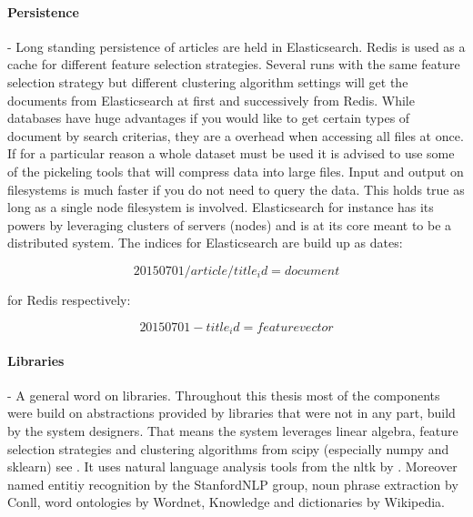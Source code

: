   \paragraph{Persistence} - Long standing persistence of articles are held in Elasticsearch. Redis is used as a cache for different feature selection strategies. Several runs with the same feature selection strategy but different clustering algorithm settings will get the documents from Elasticsearch at first and successively from Redis. While databases have huge advantages if you would like to get certain types of document by search criterias, they are a overhead when accessing all files at once. If for a particular reason a whole dataset must be used it is advised to use some of the pickeling tools that will compress data into large files. Input and output on filesystems is much faster if you do not need to query the data. This holds true as long as a single node filesystem is involved. Elasticsearch for instance has its powers by leveraging clusters of servers (nodes) and is at its core meant to be a distributed system. The indices for Elasticsearch are build up as dates:

    \begin{equation}
      20150701/article/title_id = document
    \end{equation}

  for Redis respectively:

    \begin{equation}
      20150701-title_id = feature vector
    \end{equation}

  \paragraph{Libraries} - A general word on libraries. Throughout this thesis most of the components were build on abstractions provided by libraries that were not in any part, build by the system designers. That means the system leverages linear algebra, feature selection strategies and clustering algorithms from scipy (especially numpy and sklearn) see \cite{ScikitLearn}. It uses natural language analysis tools from the nltk by \cite{NltkPython}. Moreover named entitiy recognition by the StanfordNLP group, noun phrase extraction by Conll, word ontologies by Wordnet, Knowledge and dictionaries by Wikipedia.



